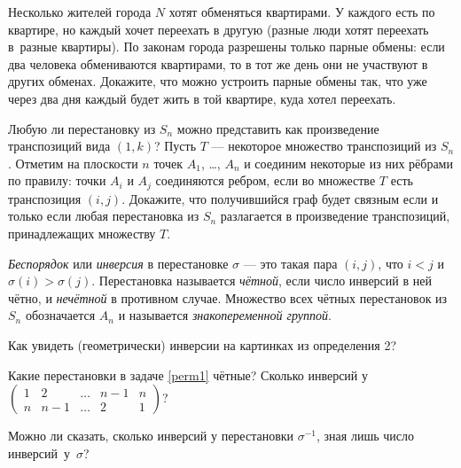 \documentclass[a4paper, 11pt]{article}
\begin{document}


Несколько жителей города $N$ хотят обменяться квартирами.
У каждого есть по квартире, но каждый хочет переехать в другую
(разные люди хотят переехать в~разные квартиры).
По законам города разрешены только парные
обмены: если два человека об\-ме\-ни\-ва\-ют\-ся квартирами, то в тот же день
они не участвуют в других обменах.
Докажите, что можно устроить парные обмены так, что уже
через два дня каждый будет жить в той квартире, куда хотел переехать.

Любую ли перестановку из $S_n$ можно представить как
произведение транспозиций вида $(1,k)$? %
Пусть $T$ --- некоторое множество транспозиций из $S_n$.
Отметим на плоскости $n$ точек $A_1$, \dots, $A_n$ и соединим
некоторые из них р\"ебрами по правилу: точки $A_i$ и $A_j$
соединяются ребром, если во множестве $T$ есть транспозиция $(i,j)$.
Докажите, что получившийся граф будет связным %
если и только если любая перестановка из $S_n$
разлагается в произведение транспозиций, %
принадлежащих множеству $T$.

\emph{Беспорядок} или \emph{инверсия} в перестановке $\sigma$
--- это такая пара $(i,j)$, что $i<j$ и $\sigma(i)>\sigma(j)$.
Перестановка называется \emph{чётной}, если число инверсий в ней
чётно, и \emph{нечётной} в противном случае. Множество всех чётных
перестановок из $S_n$ обозначается $A_n$ и называется
\emph{знакопеременной группой}.

Как увидеть (геометрически) инверсии на картинках из определения 2?

Какие перестановки в задаче \ref{perm1} чётные?
Сколько инверсий у %
$
\displaystyle
\begin{pmatrix}
1&2&\dots&n-1&n\\n&n-1&\dots&2&1
\end{pmatrix}
$?

Можно ли сказать, сколько инверсий у перестановки $\sigma^{-1}$,
зная лишь число инверсий~у~$\sigma$?
\end{document}
